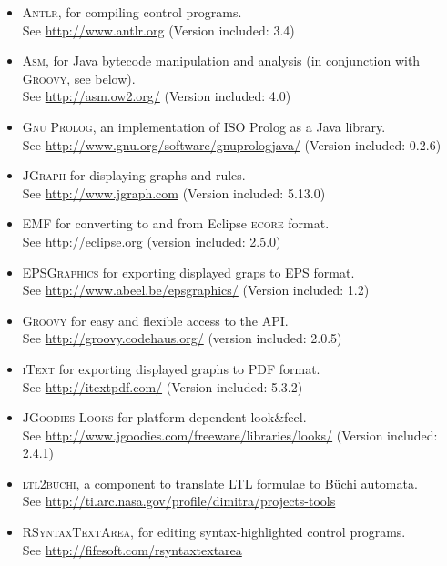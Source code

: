 \begin{itemize}\noitemsep
\item \textsc{Antlr}, for compiling control programs. \\
  See \url{http://www.antlr.org} (Version included: 3.4)
\item \textsc{Asm}, for Java bytecode manipulation and analysis (in conjunction
  with \textsc{Groovy}, see below). \\
  See \url{http://asm.ow2.org/} (Version included: 4.0)
\item \textsc{Gnu Prolog}, an implementation of ISO Prolog as a Java
  library. \\
  See \url{http://www.gnu.org/software/gnuprologjava/} (Version included:
  0.2.6)
\item \textsc{JGraph} for displaying graphs and rules. \\
  See \url{http://www.jgraph.com} (Version included: 5.13.0)
\item \textsc{EMF} for converting to and from Eclipse \textsc{ecore} format. \\
  See \url{http://eclipse.org} (version included: 2.5.0)
\item \textsc{EPSGraphics} for exporting displayed graps to EPS format. \\
  See \url{http://www.abeel.be/epsgraphics/} (Version included: 1.2)
\item \textsc{Groovy} for easy and flexible access to the \GROOVE API. \\
  See \url{http://groovy.codehaus.org/} (version included: 2.0.5)
\item \textsc{iText} for exporting displayed graphs to PDF format. \\
  See \url{http://itextpdf.com/} (Version included: 5.3.2)
\item \textsc{JGoodies Looks} for platform-dependent look\&feel. \\
  See \url{http://www.jgoodies.com/freeware/libraries/looks/} (Version
  included: 2.4.1)
\item \textsc{ltl2buchi}, a component to translate LTL formulae to
  B\"uchi automata. \\ 
  See \url{http://ti.arc.nasa.gov/profile/dimitra/projects-tools}
\item \textsc{RSyntaxTextArea}, for editing syntax-highlighted control
  programs. \\
  See \url{http://fifesoft.com/rsyntaxtextarea}
\end{itemize}

